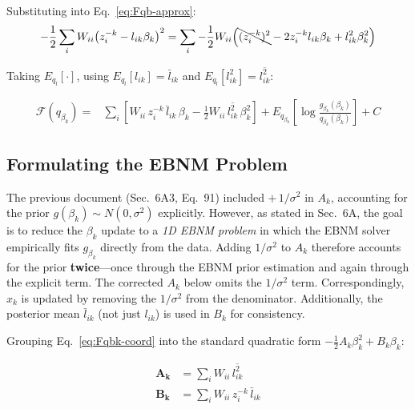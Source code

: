 \documentclass{article}[12pt]
\newcommand{\lbar}[2]{\bar{l}_{#1#2}}
\newcommand{\lsec}[2]{\overline{l^{2}_{#1#2}}}
\begin{document}
Substituting into Eq.~\eqref{eq:Fqb-approx}:
\begin{equation}
    -\frac{1}{2}\sum_i W_{ii}\!\left(z^{-k}_i - l_{ik}\beta_k\right)^2
    = \sum_i -\frac{1}{2}W_{ii}\!\left(
        \bcancel{(z^{-k}_i)^2}
        - 2z^{-k}_i l_{ik}\beta_k
        + l_{ik}^2\beta_k^2
      \right)
\end{equation}

Taking $E_{q_l}[\cdot]$, using $E_{q_l}[l_{ik}] = \lbar{i}{k}$ and
$E_{q_l}[l_{ik}^2] = \lsec{i}{k}$:

\begin{equation}
\begin{aligned}
    \mathcal{F}(q_{\beta_k}) = {} &
    \sum_i\!\left[W_{ii}\,z^{-k}_i\,\lbar{i}{k}\,\beta_k
    - \frac{1}{2}W_{ii}\,\lsec{i}{k}\,\beta_k^2\right]
    + E_{q_{\beta_k}}\!\left[\log\frac{g_{\beta_k}(\beta_k)}{q_{\beta_k}(\beta_k)}\right]
    + C
\end{aligned}
\label{eq:Fqbk-coord}
\end{equation}

\subsection{Formulating the EBNM Problem}

\begin{correctionbox}[title={Item 4 Fix: Remove Erroneous $1/\sigma^2$ Term from $A_k$}]
The previous document (Sec.~6A3, Eq.~91) included $+\,1/\sigma^2$ in $A_k$,
accounting for the prior $g(\beta_k)\sim N(0,\sigma^2)$ explicitly.  However,
as stated in Sec.~6A, the goal is to reduce the $\beta_k$ update to a \emph{1D
EBNM problem} in which the EBNM solver empirically fits $g_{\beta_k}$ directly
from the data.  Adding $1/\sigma^2$ to $A_k$ therefore accounts for the prior
\textbf{twice}---once through the EBNM prior estimation and again through the
explicit term.  The corrected $A_k$ below omits the $1/\sigma^2$ term.
Correspondingly, $x_k$ is updated by removing the $1/\sigma^2$ from the
denominator.  Additionally, the posterior mean $\lbar{i}{k}$ (not just $l_{ik}$)
is used in $B_k$ for consistency.
\end{correctionbox}

Grouping Eq.~\eqref{eq:Fqbk-coord} into the standard quadratic form
$-\frac{1}{2}A_k\beta_k^2 + B_k\beta_k$:

\begin{align}
    \mathbf{A_k} &= \sum_i W_{ii}\,\lsec{i}{k}
    \label{eq:A-beta}\\
    \mathbf{B_k} &= \sum_i W_{ii}\,z^{-k}_i\,\lbar{i}{k}
    \label{eq:B-beta}
\end{align}
\end{document}
